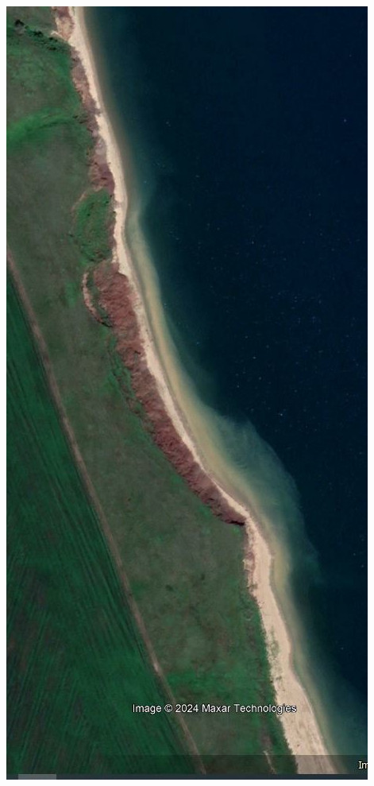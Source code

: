 \documentclass[handout]{beamer}
\begin{document}
\begin{frame}
\begin{columns}
\begin{column}{0.25\linewidth}
    \end{column}
    \begin{column}{0.25\linewidth}
      \includegraphics[width=1\linewidth]{source-img-ge.jpeg}

\end{column}
\end{columns}
\end{frame}
\end{document}
